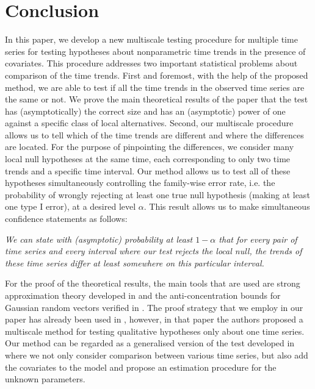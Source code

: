 \documentclass[a4paper,12pt]{article}
\begin{document}
\section{Conclusion}\label{sec:conclusion}

In this paper, we develop a new multiscale testing procedure for multiple time series for testing hypotheses about nonparametric time trends in the presence of covariates. This procedure addresses two important statistical problems about comparison of the time trends. First and foremost, with the help of the proposed method, we are able to test if all the time trends in the observed time series are the same or not. We prove the main theoretical results of the paper that the test has (asymptotically) the correct size and has an (asymptotic) power of one against a specific class of local alternatives. Second, our multiscale procedure allows us to tell which of the time trends are different and where the differences are located. For the purpose of pinpointing the differences, we consider many local null hypotheses at the same time, each corresponding to only two time trends and a specific time interval. Our method allows us to test all of these hypotheses simultaneously controlling the family-wise error rate, i.e. the probability of wrongly rejecting at least one true null hypothesis (making at least one type I error), at a desired level $\alpha$. This result allows us to make simultaneous confidence statements as follows: 

\begin{center}
\begin{minipage}[c][1.75cm][c]{14cm}
\textit{We can state with (asymptotic) probability at least $1-\alpha$ that for every pair of time series and every interval where our test rejects the local null, the trends of these time series differ at least somewhere on this particular interval.}
\end{minipage}
\end{center}

For the proof of the theoretical results, the main tools that are used are strong approximation theory developed in \cite{BerkesLiuWu2014} and the anti-concentration bounds for Gaussian random vectors verified in \cite{Chernozhukov2015}. The proof strategy that we employ in our paper has already been used in \cite{KhismatullinaVogt2020}, however, in that paper the authors proposed a multiscale method for testing qualitative hypotheses only about one time series. Our method can be regarded as a generalised version of the test developed in \cite{KhismatullinaVogt2020} where we not only consider comparison between various time series, but also add the covariates to the model and propose an estimation procedure for the unknown parameters.
\end{document}
